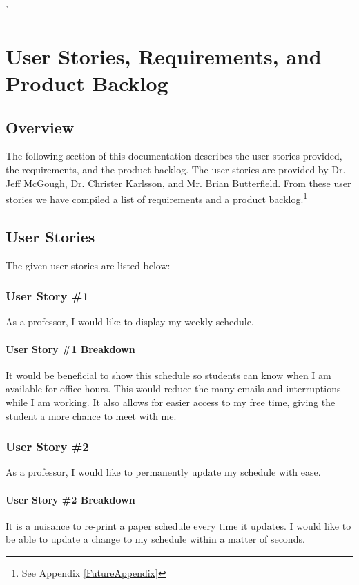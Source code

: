 '%

\chapter{User Stories,  Requirements, and Product Backlog}
\section{Overview}


The following section of this documentation describes the user stories provided, the requirements, and the product backlog. The user stories are provided by Dr. Jeff McGough, Dr. Christer Karlsson, and Mr. Brian Butterfield. From these user stories we have compiled a list of requirements and a product backlog.\footnote{See Appendix \ref{FutureAppendix}} 

\section{User Stories}
The given user stories are listed below:

\subsection{User Story \#1}
As a professor, I would like to display my weekly schedule.  
\subsubsection{User Story \#1 Breakdown}
It would be beneficial to show this schedule so students can know when I am available for office hours.  This would reduce the many emails and interruptions while I am working.  It also allows for easier access to my free time, giving the student a more chance to meet with me.

\subsection{User Story \#2} 
As a professor, I would like to permanently update my schedule with ease.  
\subsubsection{User Story \#2 Breakdown}
It is a nuisance to re-print a paper schedule every time it updates.  I would like to be able to update a change to my schedule within a matter of seconds.

